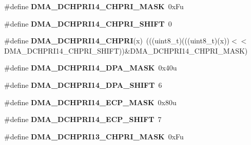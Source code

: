 \begin{DoxyCompactItemize}
\item 
\#define {\bfseries D\+M\+A\+\_\+\+D\+C\+H\+P\+R\+I14\+\_\+\+C\+H\+P\+R\+I\+\_\+\+M\+A\+SK}~0x\+Fu\hypertarget{group__DMA__Register__Masks_ga908ef8df8e7d76968f5aec7100551634}{}\label{group__DMA__Register__Masks_ga908ef8df8e7d76968f5aec7100551634}

\item 
\#define {\bfseries D\+M\+A\+\_\+\+D\+C\+H\+P\+R\+I14\+\_\+\+C\+H\+P\+R\+I\+\_\+\+S\+H\+I\+FT}~0\hypertarget{group__DMA__Register__Masks_ga160b69c2c8a275120fefd8970b4731f5}{}\label{group__DMA__Register__Masks_ga160b69c2c8a275120fefd8970b4731f5}

\item 
\#define {\bfseries D\+M\+A\+\_\+\+D\+C\+H\+P\+R\+I14\+\_\+\+C\+H\+P\+RI}(x)~(((uint8\+\_\+t)(((uint8\+\_\+t)(x))$<$$<$D\+M\+A\+\_\+\+D\+C\+H\+P\+R\+I14\+\_\+\+C\+H\+P\+R\+I\+\_\+\+S\+H\+I\+FT))\&D\+M\+A\+\_\+\+D\+C\+H\+P\+R\+I14\+\_\+\+C\+H\+P\+R\+I\+\_\+\+M\+A\+SK)\hypertarget{group__DMA__Register__Masks_ga24845399db7f9ae5525e83c66afb7223}{}\label{group__DMA__Register__Masks_ga24845399db7f9ae5525e83c66afb7223}

\item 
\#define {\bfseries D\+M\+A\+\_\+\+D\+C\+H\+P\+R\+I14\+\_\+\+D\+P\+A\+\_\+\+M\+A\+SK}~0x40u\hypertarget{group__DMA__Register__Masks_ga73cb4f5a8c28574c6d7b9548811bde25}{}\label{group__DMA__Register__Masks_ga73cb4f5a8c28574c6d7b9548811bde25}

\item 
\#define {\bfseries D\+M\+A\+\_\+\+D\+C\+H\+P\+R\+I14\+\_\+\+D\+P\+A\+\_\+\+S\+H\+I\+FT}~6\hypertarget{group__DMA__Register__Masks_ga1dd167f78a3ed39d0858085f54286371}{}\label{group__DMA__Register__Masks_ga1dd167f78a3ed39d0858085f54286371}

\item 
\#define {\bfseries D\+M\+A\+\_\+\+D\+C\+H\+P\+R\+I14\+\_\+\+E\+C\+P\+\_\+\+M\+A\+SK}~0x80u\hypertarget{group__DMA__Register__Masks_gadcb3065c2c242e3728282cb36d891952}{}\label{group__DMA__Register__Masks_gadcb3065c2c242e3728282cb36d891952}

\item 
\#define {\bfseries D\+M\+A\+\_\+\+D\+C\+H\+P\+R\+I14\+\_\+\+E\+C\+P\+\_\+\+S\+H\+I\+FT}~7\hypertarget{group__DMA__Register__Masks_gaa7495718e9a8dc1cf79def8e6053472f}{}\label{group__DMA__Register__Masks_gaa7495718e9a8dc1cf79def8e6053472f}

\item 
\#define {\bfseries D\+M\+A\+\_\+\+D\+C\+H\+P\+R\+I13\+\_\+\+C\+H\+P\+R\+I\+\_\+\+M\+A\+SK}~0x\+Fu\hypertarget{group__DMA__Register__Masks_gad9e91383771ebbcea15c43585eada037}{}\label{group__DMA__Register__Masks_gad9e91383771ebbcea15c43585eada037}


\end{DoxyCompactItemize}
